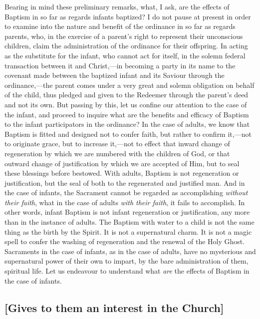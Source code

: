 \documentclass[
]{book}
\begin{document}
Bearing in mind these preliminary remarks, what, I ask, are the effects of Baptism in so far as regards infants baptized? I do not pause at present in order to examine into the nature and benefit of the ordinance in so far as regards parents, who, in the exercise of a parent's right to represent their unconscious children, claim the administration of the ordinance for their offspring. In acting as the substitute for the infant, who cannot act for itself, in the solemn federal transaction between it and Christ,---in becoming a party in its name to the covenant made between the baptized infant and its Saviour through the ordinance,---the parent comes under a very great and solemn obligation on behalf of the child, thus pledged and given to the Redeemer through the parent's deed and not its own. But passing by this, let us confine our attention to the case of the infant, and proceed to inquire what are the benefits and efficacy of Baptism to the infant participators in the ordinance? In the case of adults, we know that Baptism is fitted and designed not to confer faith, but rather to confirm it,---not to originate grace, but to increase it,---not to effect that inward change of regeneration by which we are numbered with the children of God, or that outward change of justification by which we are accepted of Him, but to seal these blessings before bestowed. With adults, Baptism is not regeneration or justification, but the seal of both to the regenerated and justified man. And in the case of infants, the Sacrament cannot be regarded as accomplishing \emph{without their faith}, what in the case of adults \emph{with their faith}, it fails to accomplish. In other words, infant Baptism is not infant regeneration or justification, any more than in the instance of adults. The Baptism with water to a child is not the same thing as the birth by the Spirit. It is not a supernatural charm. It is not a magic spell to confer the washing of regeneration and the renewal of the Holy Ghost. Sacraments in the case of infants, as in the case of adults, have no mysterious and supernatural power of their own to impart, by the bare administration of them, spiritual life. Let us endeavour to understand what \emph{are} the effects of Baptism in the case of infants.

\hypertarget{gives-to-them-an-interest-in-the-church}{%
\subsection{{[}Gives to them an interest in the Church{]}}\label{gives-to-them-an-interest-in-the-church}}
\end{document}
